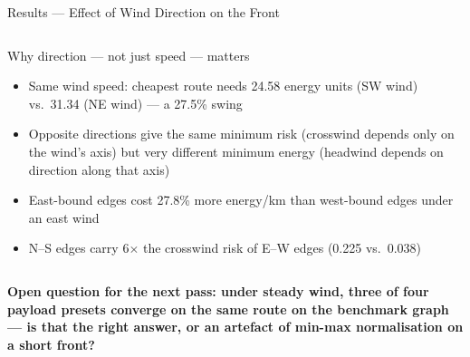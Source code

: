 \documentclass[aspectratio=169,11pt]{beamer}
\newcommand{\compactblocks}{\setbeamerfont{block title}{size=\small}}
\begin{document}
\begin{frame}{Results --- Effect of Wind Direction on the Front}
  \compactblocks
  \begin{columns}[T,onlytextwidth]
      \centering
      \begin{block}{Why direction --- not just speed --- matters}
        \scriptsize
        \begin{itemize}
          \item Same wind speed: cheapest route needs 24.58 energy units (SW wind) vs.\ 31.34 (NE wind) --- a 27.5\% swing
          \item Opposite directions give the same minimum risk (crosswind depends only on the wind's axis) but very different minimum energy (headwind depends on direction along that axis)
          \item East-bound edges cost 27.8\% more energy/km than west-bound edges under an east wind
          \item N--S edges carry 6$\times$ the crosswind risk of E--W edges (0.225 vs.\ 0.038)
        \end{itemize}
      \end{block}
  \end{columns}
  \vspace{2mm}

  {\scriptsize\textbf{Open question for the next pass: under steady wind, three of four payload presets converge on the same route on the benchmark graph --- is that the right answer, or an artefact of min-max normalisation on a short front?}}
\end{frame}
\end{document}
